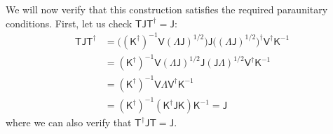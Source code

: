 \documentclass[aps, prx, nofootinbib, superscriptaddress]{revtex4-2}
\begin{document}
We will now verify that this construction satisfies the required paraunitary conditions. First, let us check $\mathsf{TJT}^{\dagger} = \mathsf{J}$:
\begin{align*}
    \mathsf{TJT}^{\dagger} &= 
    \big( (\mathsf{K}^{\dagger})^{-1} \mathsf{V} \mathsf{(\Lambda J)}^{1/2} \big) \mathsf{J} \big( \mathsf{(\Lambda J)}^{1/2} \big)^{\dagger} \mathsf{V}^{\dagger} \mathsf{K}^{-1} \\
    &= (\mathsf{K}^{\dagger})^{-1} \mathsf{V} \mathsf{(\Lambda J)}^{1/2} \mathsf{J} \mathsf{(J\Lambda)}^{1/2} \mathsf{V}^{\dagger} \mathsf{K}^{-1} \\
    &= (\mathsf{K}^{\dagger})^{-1} \mathsf{V} \mathsf{\Lambda} \mathsf{V}^{\dagger} \mathsf{K}^{-1} \\
    &= (\mathsf{K}^{\dagger})^{-1} (\mathsf{K}^{\dagger} \mathsf{JK}) \mathsf{K}^{-1} = \mathsf{J}
\end{align*}
where we can also verify that $\mathsf{T}^{\dagger} \mathsf{JT} = \mathsf{J}$.
\end{document}
